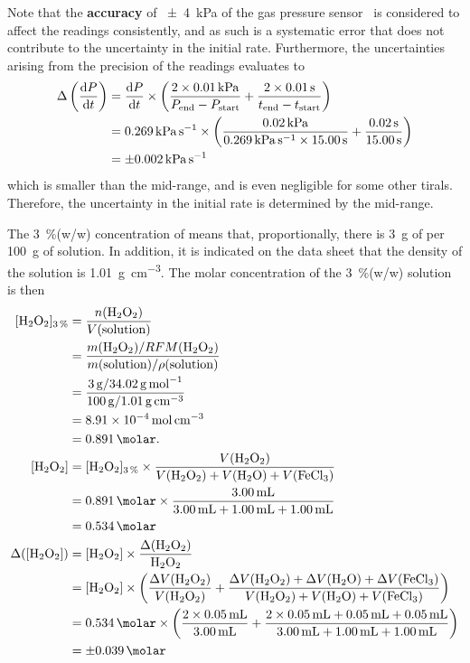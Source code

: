 \documentclass[a4paper, 12pt]{article}
\begin{document}
Note that the \textbf{accuracy} of \SI{\pm 4}{\kPa} of the gas pressure sensor~\cite{vernier_gas_pressure} is considered to affect the readings consistently, and as such is a systematic error that does not contribute to the uncertainty in the initial rate. Furthermore, the uncertainties arising from the precision of the readings evaluates to 
\begin{align*}
    \Delta \left(\dv{P}{t}\right) 
    &=  \dv{P}{t} 
        \times \left(
            \frac{ 2 \times \SI{0.01}{\kPa} }{P_{ \text{end} } - P_{ \text{start} }}
            + \frac{ 2 \times \SI{0.01}{\s} }{t_{ \text{end} } - t_{ \text{start} }}
        \right)\\
    &= \SI{0.269}{\kPa\per\s} \times \left( \frac{\SI{0.02}{\kPa}}{\SI{0.269}{\kPa\per\s} \times \SI{15.00}{\s}} + \frac{\SI{0.02}{\s}}{\SI{15.00}{\s}} \right)\\
    &= \SI{+-0.002}{\kPa\per\s}
\end{align*}
which is smaller than the mid-range, and is even negligible for some other tirals. Therefore, the uncertainty in the initial rate is determined by the mid-range.

The \SI{3}{\%}(w/w) concentration of  means that, proportionally, there is \SI{3}{\g} of  per \SI{100}{\g} of solution. In addition, it is indicated on the data sheet \autocite{safety_h2o2} that the density of the solution is \SI{1.01}{\g\per\cm^3}. The molar concentration of the \SI{3}{\%}(w/w)  solution is then
\begin{align*}
    [\ce{H2O2}]_{\SI{3}{\%}}
    &= \dfrac{ n(\ce{H2O2}) }{ V(\text{solution}) }\\
    &= \dfrac{ m(\ce{H2O2}) / RFM(\ce{H2O2}) }{ m(\text{solution}) / \rho(\text{solution})}\\
    &= \dfrac{ \SI{3}{\g} / \SI{34.02}{\g\per\mol} } { \SI{100}{\g} / \SI{1.01}{\g\per\cm\cubed} }\\
    &= \SI{8.91E-4}{\mol\per\cm\cubed}\\
    &= \SI{0.891}{\molar}.\\
    [\ce{H2O2}]
    &= [\ce{H2O2}]_{\SI{3}{\%}} \times \dfrac{ V(\ce{H2O2}) }{ V(\ce{H2O2}) + V(\ce{H2O}) + V(\ce{FeCl3}) }\\
    &= \SI{0.891}{\molar} \times \dfrac{ \SI{3.00}{\mL} }{ \SI{3.00}{\mL} + \SI{1.00}{\mL} + \SI{1.00}{\mL} }\\
    &= \SI{0.534}{\molar}\\
    \Delta([\ce{H2O2}])
    &= [\ce{H2O2}] \times \fracDeltaP{\ce{H2O2}}\\
    &= [\ce{H2O2}] \times \left(\fracDelta{V(\ce{H2O2})} + \frac{ \Delta V(\ce{H2O2}) + \Delta V(\ce{H2O}) + \Delta V(\ce{FeCl3}) }{ V(\ce{H2O2}) + V(\ce{H2O}) + V(\ce{FeCl3}) }\right)\\
    &= \SI{0.534}{\molar} \times \left(\frac{ 2 \times \SI{0.05}{\mL} }{ \SI{3.00}{\mL} } + \frac{ 2 \times \SI{0.05}{\mL} + \SI{0.05}{\mL} + \SI{0.05}{\mL} }{ \SI{3.00}{\mL} + \SI{1.00}{\mL} + \SI{1.00}{\mL} }\right)\\
    &= \SI{+-0.039}{\molar}
\end{align*}
\end{document}
